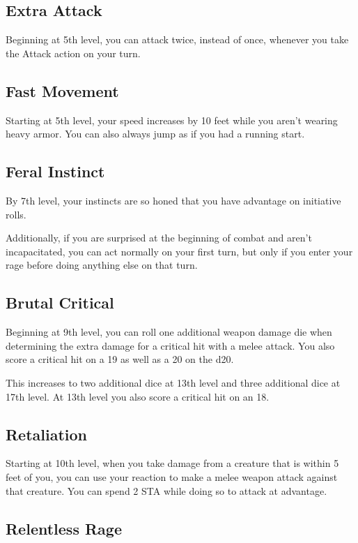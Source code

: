\subsection{Extra Attack}

Beginning at 5th level, you can attack twice, instead of once, whenever you take the Attack action on your turn.

\subsection{Fast Movement}

Starting at 5th level, your speed increases by 10 feet while you aren’t wearing heavy armor. You can also always jump as if you had a running start.

\subsection{Feral Instinct}

By 7th level, your instincts are so honed that you have advantage on initiative rolls.

Additionally, if you are surprised at the beginning of combat and aren’t incapacitated, you can act normally on your first turn, but only if you enter your rage before doing anything else on that turn.

\subsection{Brutal Critical}

Beginning at 9th level, you can roll one additional weapon damage die when determining the extra damage for a critical hit with a melee attack. You also score a critical hit on a 19 as well as a 20 on the d20.

This increases to two additional dice at 13th level and three additional dice at 17th level. At 13th level you also score a critical hit on an 18.

\subsection{Retaliation}
Starting at 10th level, when you take damage from a creature that is within 5 feet of you, you can use your reaction to make a melee weapon attack against that creature. You can spend 2 STA while doing so to attack at advantage.

\subsection{Relentless Rage}

